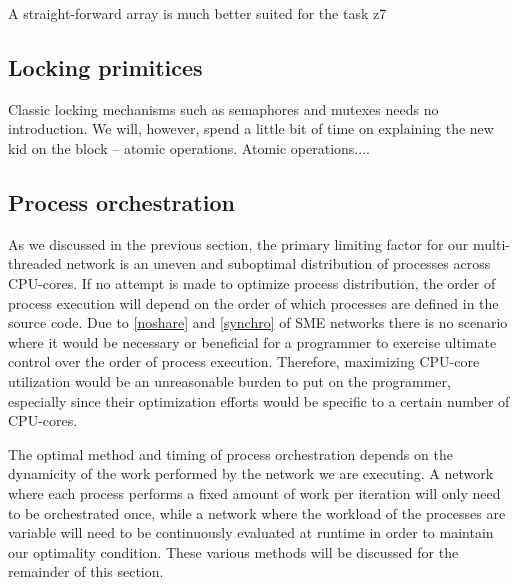 A straight-forward array is much better suited for the task z7

\subsection{Locking primitices}
Classic locking mechanisms such as semaphores and mutexes needs no
introduction. We will, however, spend a little bit of time on
explaining the new kid on the block -- atomic operations.  Atomic
operations....

\subsection{Process orchestration}
As we discussed in the previous section, the primary limiting factor
for our multi-threaded network is an uneven and suboptimal
distribution of processes across CPU-cores. If no attempt is made to
optimize process distribution, the order of process execution will
depend on the order of which processes are defined in the source
code. Due to \cref{noshare} and \cref{synchro} of SME
networks there is no scenario where it would be necessary or
beneficial for a programmer to exercise ultimate control over the
order of process execution. Therefore, maximizing CPU-core utilization
would be an unreasonable burden to put on the programmer, especially
since their optimization efforts would be specific to a certain number
of CPU-cores.

The optimal method and timing of process orchestration depends on the
dynamicity  of the work
performed by the network we are executing. A network where each
process performs a fixed amount of work per iteration will only need
to be orchestrated once, while a network where the workload of the
processes are variable will need to be continuously evaluated at
runtime in order to maintain our optimality condition. These various
methods will be discussed for the remainder of this section.


